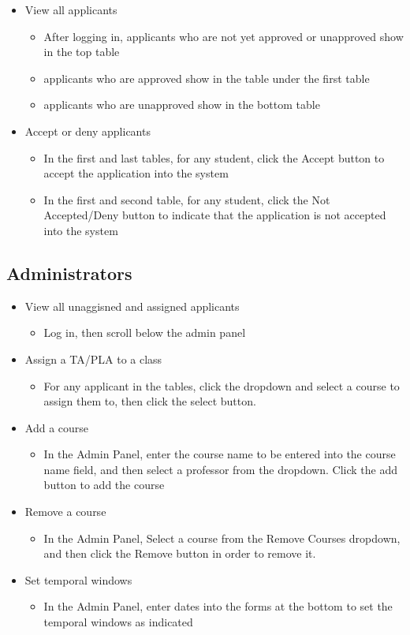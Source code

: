 \documentclass[11pt]{amsart}
\begin{document}
\begin{itemize}
	\item{View all applicants}
	\begin{itemize}
		\item{After logging in, applicants who are not yet approved or unapproved show in the top table}
		\item{applicants who are approved show in the table under the first table}
		\item{applicants who are unapproved show in the bottom table}
	\end{itemize}
	\item{Accept or deny applicants}
	\begin{itemize}
		\item{In the first and last tables, for any student, click the Accept button to accept the application into the system}
		\item{In the first and second table, for any student, click the Not Accepted/Deny button to indicate that the application is not accepted into the system}
	\end{itemize}
\end{itemize}

\subsection{Administrators}

\begin{itemize}
	\item{View all unaggisned and assigned applicants}
	\begin{itemize}
		\item{Log in, then scroll below the admin panel}
	\end{itemize}
	\item{Assign a TA/PLA to a class}
	\begin{itemize}
		\item{For any applicant in the tables, click the dropdown and select a course to assign them to, then click the select button.}
	\end{itemize}
	\item{Add a course}
	\begin{itemize}
		\item{In the Admin Panel, enter the course name to be entered into the course name field, and then select a professor from the dropdown. Click the add button to add the course}
	\end{itemize}
	\item{Remove a course}
	\begin{itemize}
		\item{In the Admin Panel, Select a course from the Remove Courses dropdown, and then click the Remove button in order to remove it.}
	\end{itemize}
	\item{Set temporal windows}
	\begin{itemize}
		\item{In the Admin Panel, enter dates into the forms at the bottom to set the temporal windows as indicated}
	\end{itemize}
\end{itemize}
\end{document}

